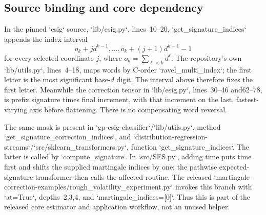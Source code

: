 \documentclass[10pt]{article}
\begin{document}
\subsection*{Source binding and core dependency}
In the pinned `esig` source, `lib/esig.py`, lines 10–20, `get\_signature\_indices` appends the index interval \[o_k+j d^{k-1},\ldots,o_k+(j+1)d^{k-1}-1\] for every selected coordinate \(j\), where \(o_k=\sum_{\ell<k}d^\ell\). The repository’s own `lib/utils.py`, lines 4–18, maps words by C-order `ravel\_multi\_index`; the first letter is the most significant base-\(d\) digit. The interval above therefore fixes the first letter. Meanwhile the correction tensor in `lib/esig.py`, lines 30–46 and62–78, is prefix signature times final increment, with that increment on the last, fastest-varying axis before flattening. There is no compensating word reversal.\par
The same mask is present in `gp-esig-classifier`/`lib/utils.py`, method `get\_signature\_correction\_indices`, and `distribution-regression-streams`/`src/sklearn\_transformers.py`, function `get\_signature\_indices`. The latter is called by `compute\_signature`. In `src/SES.py`, adding time puts time first and shifts the supplied martingale indices by one; the pathwise expected-signature transformer then calls the affected routine. The released `martingale-correction-examples/rough\_volatility\_experiment.py` invokes this branch with `at=True`, depths 2,3,4, and `martingale\_indices=[0]`. Thus this is part of the released core estimator and application workflow, not an unused helper.\par
\end{document}

